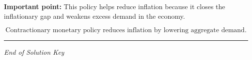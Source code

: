 \documentclass[12pt]{article}
\begin{document}
\textbf{Important point:}  
This policy helps reduce inflation because it closes the inflationary gap and weakens excess demand in the economy.

\[
\boxed{\text{Contractionary monetary policy reduces inflation by lowering aggregate demand.}}
\]

\hrule
\vspace{1em}

\begin{center}
\textit{End of Solution Key}
\end{center}
\end{document}
